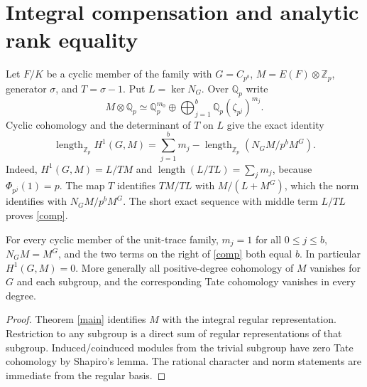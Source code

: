 \documentclass[11pt,a4paper]{article}
\newcommand{\Zp}{\mathbb Z_p}\newcommand{\Qp}{\mathbb Q_p}\newcommand{\Fp}{\mathbb F_p}\newcommand{\Q}{\mathbb Q}\newcommand{\Sha}{\operatorname{Sha}}\newcommand{\Sel}{\operatorname{Sel}}\newcommand{\Gal}{\operatorname{Gal}}\newcommand{\Tr}{\operatorname{Tr}}\newcommand{\rk}{\operatorname{rank}}\newcommand{\ord}{\operatorname{ord}}\newcommand{\Hom}{\operatorname{Hom}}\newcommand{\SL}{\operatorname{SL}}\newcommand{\GL}{\operatorname{GL}}\newcommand{\coker}{\operatorname{coker}}\newcommand{\length}{\operatorname{length}}\newcommand{\res}{\operatorname{res}}\newcommand{\cor}{\operatorname{cor}}\newcommand{\Id}{\operatorname{id}}
\numberwithin{equation}{section}
\begin{document}
\section{Integral compensation and analytic rank equality}\label{analytic}
Let $F/K$ be a cyclic member of the family with $G=C_{p^b}$, $M=E(F)\otimes\Zp$, generator $\sigma$, and $T=\sigma-1$. Put $L=\ker N_G$. Over $\Qp$ write
\[ M\otimes\Qp\simeq \Qp^{m_0}\oplus\bigoplus_{j=1}^b\Qp(\zeta_{p^j})^{m_j}. \]
Cyclic cohomology and the determinant of $T$ on $L$ give the exact identity
\begin{equation}\label{comp}
\length_{\Zp}H^1(G,M)=\sum_{j=1}^b m_j-
\length_{\Zp}\left(N_GM/p^bM^G\right).
\end{equation}
Indeed, $H^1(G,M)=L/TM$ and $\length(L/TL)=\sum_j m_j$, because $\Phi_{p^j}(1)=p$. The map $T$ identifies $TM/TL$ with $M/(L+M^G)$, which the norm identifies with $N_GM/p^bM^G$. The short exact sequence with middle term $L/TL$ proves \eqref{comp}.
\begin{corollary}\label{zerodefect}
For every cyclic member of the unit-trace family, $m_j=1$ for all $0\le j\le b$, $N_GM=M^G$, and the two terms on the right of \eqref{comp} both equal $b$. In particular $H^1(G,M)=0$. More generally all positive-degree cohomology of $M$ vanishes for $G$ and each subgroup, and the corresponding Tate cohomology vanishes in every degree.
\end{corollary}
\begin{proof}
Theorem \ref{main} identifies $M$ with the integral regular representation. Restriction to any subgroup is a direct sum of regular representations of that subgroup. Induced/coinduced modules from the trivial subgroup have zero Tate cohomology by Shapiro's lemma. The rational character and norm statements are immediate from the regular basis.
\end{proof}
\end{document}
